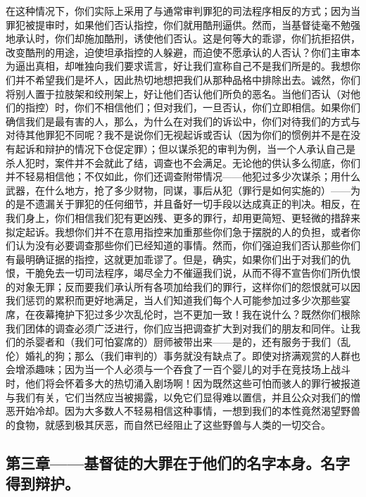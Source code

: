 在这种情况下，你们实际上采用了与通常审判罪犯的司法程序相反的方式；因为当罪犯被提审时，如果他们否认指控，你们就用酷刑逼供。然而，当基督徒毫不勉强地承认时，你们却施加酷刑，诱使他们否认。这是何等大的乖谬，你们抗拒招供，改变酷刑的用途，迫使坦承指控的人躲避，而迫使不愿承认的人否认？你们主审本为逼出真相，却唯独向我们要求谎言，好让我们宣称自己不是我们所是的。我想你们并不希望我们是坏人，因此热切地想把我们从那种品格中排除出去。诚然，你们将别人置于拉肢架和绞刑架上，好让他们否认他们所负的恶名。当他们否认（对他们的指控）时，你们不相信他们；但对我们，一旦否认，你们立即相信。如果你们确信我们是最有害的人，那么，为什么在对我们的诉讼中，你们对待我们的方式与对待其他罪犯不同呢？我不是说你们无视起诉或否认（因为你们的惯例并不是在没有起诉和辩护的情况下仓促定罪）；但以谋杀犯的审判为例，当一个人承认自己是杀人犯时，案件并不会就此了结，调查也不会满足。无论他的供认多么彻底，你们并不轻易相信他；不仅如此，你们还调查附带情况——他犯过多少次谋杀；用什么武器，在什么地方，抢了多少财物，同谋，事后从犯（罪行是如何实施的）——为的是不遗漏关于罪犯的任何细节，并且备好一切手段以达成真正的判决。相反，在我们身上，你们相信我们犯有更凶残、更多的罪行，却用更简短、更轻微的措辞来拟定起诉。我想你们并不在意用指控来加重那些你们急于摆脱的人的负担，或者你们认为没有必要调查那些你们已经知道的事情。然而，你们强迫我们否认那些你们有最明确证据的指控，这就更加乖谬了。但是，确实，如果你们出于对我们的仇恨，干脆免去一切司法程序，竭尽全力不催逼我们说，从而不得不宣告你们所仇恨的对象无罪；反而要我们承认所有各项加给我们的罪行，这样你们的怨恨就可以因我们惩罚的累积而更好地满足，当人们知道我们每个人可能参加过多少次那些宴席，在夜幕掩护下犯过多少次乱伦时，岂不更加一致！我在说什么？既然你们根除我们团体的调查必须广泛进行，你们应当把调查扩大到对我们的朋友和同伴。让我们的杀婴者和（我们可怕宴席的）厨师被带出来——是的，还有服务于我们（乱伦）婚礼的狗；那么（我们审判的）事务就没有缺点了。即使对挤满观赏的人群也会增添趣味；因为当一个人必须与一个吞食了一百个婴儿的对手在竞技场上战斗时，他们将会怀着多大的热切涌入剧场啊！因为既然这些可怕而骇人的罪行被报道与我们有关，它们当然应当被揭露，以免它们显得难以置信，并且公众对我们的憎恶开始冷却。因为大多数人不轻易相信这种事情，一想到我们的本性竟然渴望野兽的食物，就感到极其厌恶，而自然已经阻止了这些野兽与人类的一切交合。\par


\subsection{第三章——基督徒的大罪在于他们的名字本身。名字得到辩护。}

